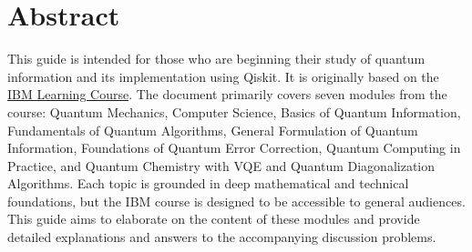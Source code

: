 \thispagestyle{plain}
\chapter*{Abstract}

This guide is intended for those who are beginning their study of quantum information and its implementation using Qiskit. It is originally based on the \href{https://quantum.cloud.ibm.com/learning/en}{IBM Learning Course}. The document primarily covers seven modules from the course: Quantum Mechanics, Computer Science, Basics of Quantum Information, Fundamentals of Quantum Algorithms, General Formulation of Quantum Information, Foundations of Quantum Error Correction, Quantum Computing in Practice, and Quantum Chemistry with VQE and Quantum Diagonalization Algorithms.
Each topic is grounded in deep mathematical and technical foundations, but the IBM course is designed to be accessible to general audiences. This guide aims to elaborate on the content of these modules and provide detailed explanations and answers to the accompanying discussion problems.


\MediaOptionLogicBlank